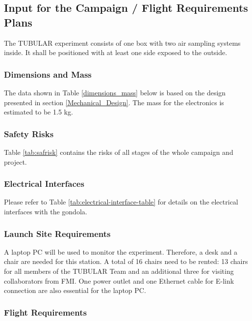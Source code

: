 \subsection{Input for the Campaign / Flight Requirements Plans}

The TUBULAR experiment consists of one box with two air sampling systems inside. It shall be positioned with at least one side exposed to the outside.

\subsubsection{Dimensions and Mass}

The data shown in Table \ref{dimensions_mass} below is based on the design presented in section \ref{Mechanical_Design}.  The mass for the electronics is estimated to be 1.5 kg.  



\subsubsection{Safety Risks}
Table \ref{tab:safrisk} contains the risks of all stages of the whole campaign and project.


\pagebreak
\subsubsection{Electrical Interfaces}

Please refer to Table \ref{tab:electrical-interface-table} for details on the electrical interfaces with the gondola.



\subsubsection{Launch Site Requirements}
A laptop PC will be used to monitor the experiment. Therefore, a desk and a chair are needed for this station. A total of 16 chairs need to be rented: 13 chairs for all members of the TUBULAR Team and an additional three for visiting collaborators from FMI. One power outlet and one Ethernet cable for E-link connection are also essential for the laptop PC.

\subsubsection{Flight Requirements}

